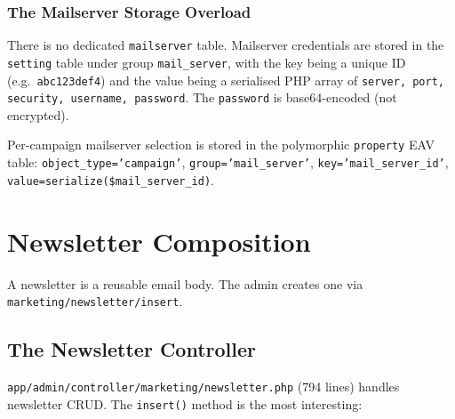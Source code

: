 \documentclass[11pt,a4paper]{article}
\begin{document}
\subsubsection{The Mailserver Storage Overload}

There is no dedicated \texttt{mailserver} table. Mailserver
credentials are stored in the \texttt{setting} table under group
\texttt{mail\_server}, with the key being a unique ID (e.g.\
\texttt{abc123def4}) and the value being a serialised PHP array
of \texttt{server, port, security, username, password}. The
\texttt{password} is base64-encoded (not encrypted).

Per-campaign mailserver selection is stored in the polymorphic
\texttt{property} EAV table: \texttt{object\_type='campaign'},
\texttt{group='mail\_server'}, \texttt{key='mail\_server\_id'},
\texttt{value=serialize(\$mail\_server\_id)}.

\section{Newsletter Composition}\label{sec:newsletters}

A newsletter is a reusable email body. The admin creates one via
\texttt{marketing/newsletter/insert}.

\subsection{The Newsletter Controller}

\texttt{app/admin/controller/marketing/newsletter.php} (794 lines)
handles newsletter CRUD. The \texttt{insert()} method is the most
interesting:
\end{document}
